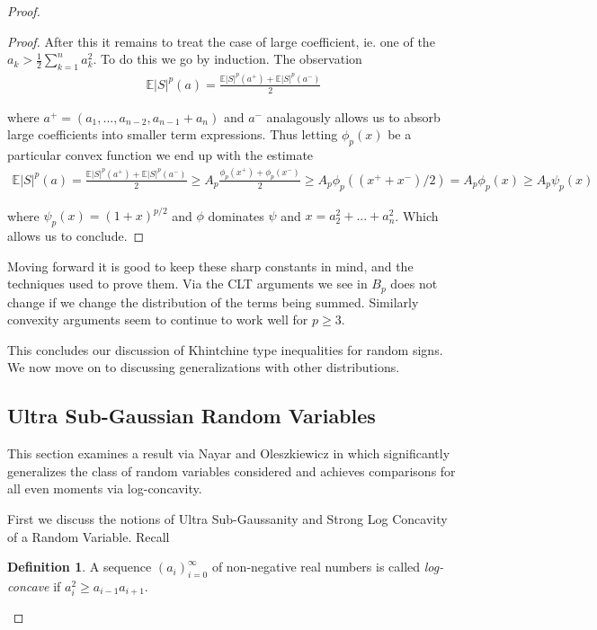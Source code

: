 \documentclass[10pt]{article}
\newcommand{\E}{\mathbb{E}}
\newcommand{\1}{\textbf{1}}
\theoremstyle{remark}
\theoremstyle{definition}
\newtheorem{defn}[theorem]{Definition}
\begin{document}
\begin{proof}
\begin{proof}
	After this it remains to treat the case of large coefficient, ie. one of the $a_k > \frac{1}{2}\sum_{k=1}^na_k^2$. To do this we go by induction. The observation
	\begin{align*}
		\E|S|^p(a) = \frac{\E|S|^p(a^+) + \E|S|^p(a^-)}{2}
	\end{align*}

	where $a^+ = (a_1,...,a_{n-2},a_{n-1}+a_n)$ and $a^-$ analagously allows us to absorb large coefficients into smaller term expressions. Thus letting $\phi_p(x)$ be a particular convex function we end up with the estimate
	\begin{align*}
		\E|S|^p(a) = \frac{\E|S|^p(a^+) + \E|S|^p(a^-)}{2} \geq A_p \frac{\phi_p(x^+)+\phi_p(x^-)}{2} \geq A_p\phi_p((x^++x^-)/2) = A_p \phi_p(x) \geq A_p \psi_p(x)
	\end{align*}

	where $\psi_p(x) = (1+x)^{p/2}$ and $\phi$ dominates $\psi$ and $x = a_2^2 + ... + a_n^2$. Which allows us to conclude.

\end{proof}

Moving forward it is good to keep these sharp constants in mind, and the techniques used to prove them. Via the CLT arguments we see in $B_p$ does not change if we change the distribution of the terms being summed. Similarly convexity arguments seem to continue to work well for $p \geq 3$. 

This concludes our discussion of Khintchine type inequalities for random signs. We now move on to discussing generalizations with other distributions.

\subsection{Ultra Sub-Gaussian Random Variables}

This section examines a result via Nayar and Oleszkiewicz in \cite{NO} which significantly generalizes the class of random variables considered and achieves comparisons for all even moments via log-concavity.

First we discuss the notions of Ultra Sub-Gaussanity and Strong Log Concavity of a Random Variable. Recall

\begin{defn}
	A sequence $(a_i)_{i=0}^{\infty}$ of non-negative real numbers is called \textit{log-concave} if $a_i^2 \geq a_{i-1}a_{i+1}$.
\end{defn}


\end{proof}
\end{document}
